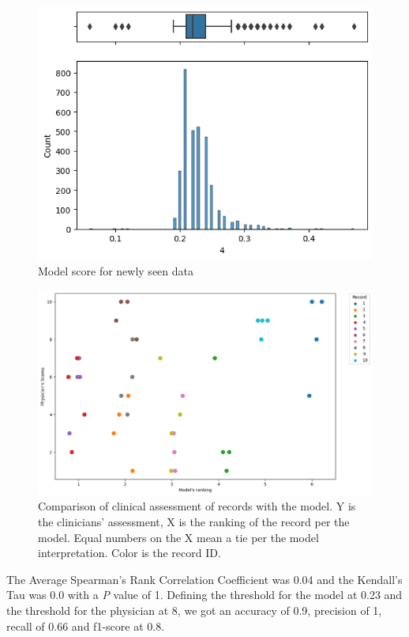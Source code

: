 \begin{figure}[htbp]
\centering
\caption{Model score for newly seen data}\label{fig:scores} 
\includegraphics[scale=0.78]{figures/Scoring.png}
\end{figure}

\begin{figure}[htbp]
\centering
\caption{Comparison of clinical assessment of records with the model. Y is the clinicians' assessment, X is the ranking of the record per the model. Equal numbers on the X mean a tie per the model interpretation. Color is the record ID.}\label{fig:clinical_dq} 
\includegraphics[scale=0.52]{figures/clinical_assessment_dataqual_scatter.png}
\end{figure}

The Average Spearman's Rank Correlation Coefficient was 0.04 and the Kendall's Tau was 0.0 with a \textit{P} value of 1. Defining the threshold for the model at 0.23 and the threshold for the physician at 8, we got an accuracy of 0.9, precision of 1, recall of 0.66 and f1-score at 0.8.
